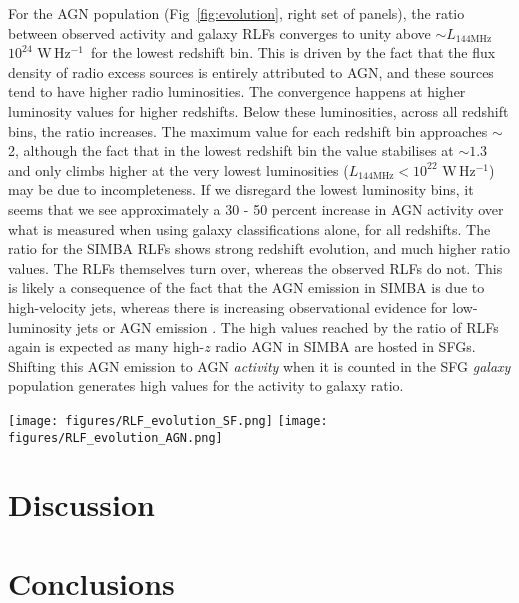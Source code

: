 \documentclass[usenatbib,fleqn,letters]{mnras}
\newcommand{\wphz}{$\,$W$\,$Hz$^{-1}$}
\newcommand{\llof}{$L_{\textrm{144MHz}}$}
\begin{document}
For the AGN population (Fig~\ref{fig:evolution}, right set of panels), the ratio between observed activity and galaxy RLFs converges to unity above $\sim$\llof $10^{24}\,$\wphz\ for the lowest redshift bin. This is driven by the fact that the flux density of radio excess sources is entirely attributed to AGN, and these sources tend to have higher radio luminosities. The convergence happens at higher luminosity values for higher redshifts. Below these luminosities, across all redshift bins, the ratio increases. The maximum value for each redshift bin approaches $\sim$2, although the fact that in the lowest redshift bin the value stabilises at $\sim1.3$ and only climbs higher at the very lowest luminosities (\llof $<10^{22}\,$\wphz ) may be due to incompleteness. If we disregard the lowest luminosity bins, it seems that we see approximately a 30 - 50 percent increase in AGN activity over what is measured when using galaxy classifications alone, for all redshifts. The ratio for the SIMBA RLFs shows strong redshift evolution, and much higher ratio values. The RLFs themselves turn over, whereas the observed RLFs do not. This is likely a consequence of the fact that the AGN emission in SIMBA is due to high-velocity jets, whereas there is increasing observational evidence for low-luminosity jets or AGN emission \citep{macfarlane_radio_2021,yue_novel_2024}. The high values reached by the ratio of RLFs again is expected as many high-$z$ radio AGN in SIMBA are hosted in SFGs. Shifting this AGN emission to AGN \textit{activity} when it is counted in the SFG \textit{galaxy} population generates high values for the activity to galaxy ratio. 


\begin{figure*}
    \centering
    \texttt{[image: figures/RLF\_evolution\_SF.png]}
    \texttt{[image: figures/RLF\_evolution\_AGN.png]}
    \caption{Caption}
    \label{fig:evolution}
\end{figure*}


\section{Discussion}

\section{Conclusions}
\end{document}
